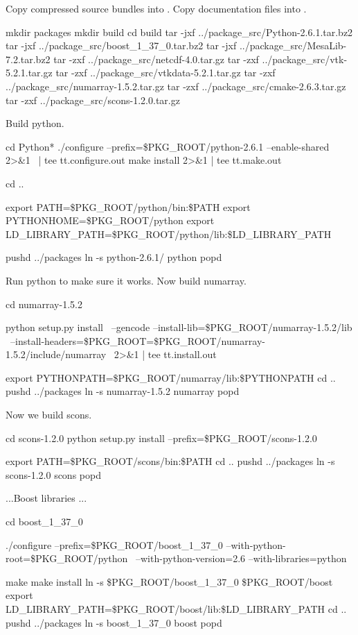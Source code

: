 Copy compressed source bundles into .
Copy documentation files into .

\begin{shellCode}
mkdir packages
mkdir build
cd build
tar -jxf ../package_src/Python-2.6.1.tar.bz2
tar -jxf ../package_src/boost_1_37_0.tar.bz2
tar -jxf ../package_src/MesaLib-7.2.tar.bz2
tar -zxf ../package_src/netcdf-4.0.tar.gz
tar -zxf ../package_src/vtk-5.2.1.tar.gz
tar -zxf ../package_src/vtkdata-5.2.1.tar.gz
tar -zxf ../package_src/numarray-1.5.2.tar.gz
tar -zxf ../package_src/cmake-2.6.3.tar.gz
tar -zxf ../package_src/scons-1.2.0.tar.gz
\end{shellCode}

Build python.
\begin{shellCode}
cd Python*
./configure --prefix=\$PKG_ROOT/python-2.6.1 --enable-shared 2>&1 \
  | tee tt.configure.out
make install 2>&1 | tee tt.make.out

cd ..

export PATH=\$PKG_ROOT/python/bin:\$PATH
export PYTHONHOME=\$PKG_ROOT/python
export LD_LIBRARY_PATH=\$PKG_ROOT/python/lib:\$LD_LIBRARY_PATH

pushd ../packages
ln -s python-2.6.1/ python
popd

\end{shellCode}

Run python to make sure it works.
Now build numarray.

\begin{shellCode}
cd numarray-1.5.2

python setup.py install \
 --gencode --install-lib=\$PKG_ROOT/numarray-1.5.2/lib \
 --install-headers=\$PKG_ROOT=\$PKG_ROOT/numarray-1.5.2/include/numarray \ 
   2>&1 | tee tt.install.out


export PYTHONPATH=\$PKG_ROOT/numarray/lib:\$PYTHONPATH
cd ..
pushd ../packages
ln -s numarray-1.5.2 numarray
popd
\end{shellCode}

Now we build scons.
\begin{shellCode}
cd scons-1.2.0
python setup.py install --prefix=\$PKG_ROOT/scons-1.2.0

export PATH=\$PKG_ROOT/scons/bin:\$PATH
cd ..
pushd ../packages
ln -s scons-1.2.0 scons
popd
\end{shellCode}

...Boost libraries ...
\begin{shellCode}
cd boost_1_37_0

./configure --prefix=\$PKG_ROOT/boost_1_37_0 --with-python-root=\$PKG_ROOT/python \
  --with-python-version=2.6 --with-libraries=python

make
make install
ln -s \$PKG_ROOT/boost_1_37_0 \$PKG_ROOT/boost
export LD_LIBRARY_PATH=\$PKG_ROOT/boost/lib:\$LD_LIBRARY_PATH
cd ..
pushd ../packages
ln -s boost_1_37_0 boost
popd
\end{shellCode}

